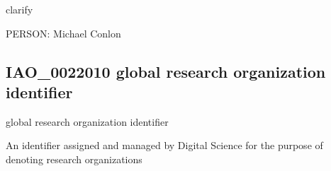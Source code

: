\documentclass[letterpaper,10pt,english]{sphinxmanual}
\begin{document}
\begin{sphinxShadowBox}

\sphinxAtStartPar
clarify
\end{sphinxShadowBox}

\begin{sphinxShadowBox}

\sphinxAtStartPar
{}
\end{sphinxShadowBox}

\begin{sphinxShadowBox}

\sphinxAtStartPar
PERSON: Michael Conlon
\end{sphinxShadowBox}
\begin{quote}

\ignorespaces \end{quote}


\subsection{IAO\_0022010 \sphinxhyphen{} global research organization identifier}
\label{\detokenize{doc-IAO_0022010:iao-0022010-global-research-organization-identifier}}\label{\detokenize{doc-IAO_0022010:index-0}}\label{\detokenize{doc-IAO_0022010::doc}}
\begin{sphinxShadowBox}

\sphinxAtStartPar
global research organization identifier
\end{sphinxShadowBox}

\begin{sphinxShadowBox}

\sphinxAtStartPar
An identifier assigned and managed by Digital Science for the purpose of denoting research organizations
\end{sphinxShadowBox}

\begin{sphinxShadowBox}

\sphinxAtStartPar
{}
\end{sphinxShadowBox}
\end{document}
